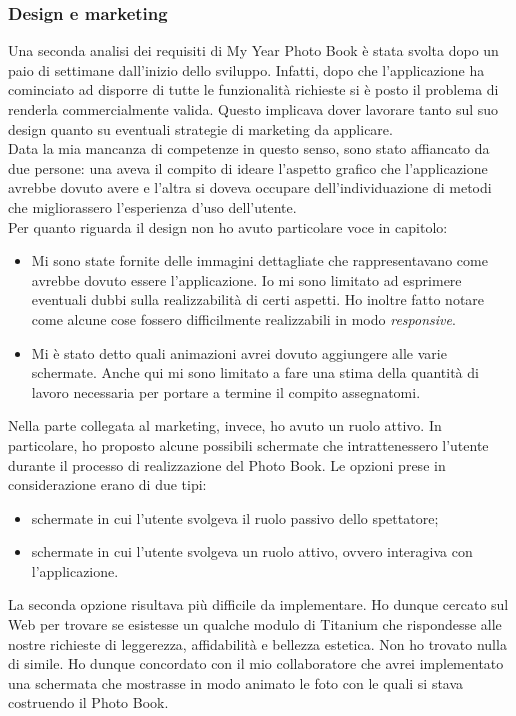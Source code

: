 			\subsubsection{Design e marketing}
				Una seconda analisi dei requisiti di My Year Photo Book è stata svolta dopo un paio di settimane dall'inizio dello
				sviluppo. Infatti, dopo che l'applicazione ha cominciato ad disporre di tutte le funzionalità richieste si è posto il
				problema di renderla commercialmente valida. Questo implicava dover lavorare tanto sul suo design quanto su eventuali
				strategie di marketing da applicare.\\
				Data la mia mancanza di competenze in questo senso, sono stato affiancato da due persone: una aveva il compito di
				ideare l'aspetto grafico che l'applicazione avrebbe dovuto avere e l'altra si doveva occupare dell'individuazione di
				metodi che migliorassero l'esperienza d'uso dell'utente.\\
				Per quanto riguarda il design non ho avuto particolare voce in capitolo:
				\begin{itemize}
					\item Mi sono state fornite delle immagini dettagliate che rappresentavano come avrebbe dovuto essere
					l'applicazione. Io mi sono limitato ad esprimere eventuali dubbi sulla realizzabilità di certi aspetti. Ho
					inoltre fatto notare come alcune cose fossero difficilmente realizzabili in modo \emph{responsive}.
					\item Mi è stato detto quali animazioni avrei dovuto aggiungere alle varie schermate. Anche qui mi sono
					limitato a fare una stima della quantità di lavoro necessaria per portare a termine il compito assegnatomi.
				\end{itemize}
				Nella parte collegata al marketing, invece, ho avuto un ruolo attivo. In particolare, ho proposto alcune possibili
				schermate che intrattenessero l'utente durante il processo di realizzazione del Photo Book. Le opzioni prese in
				considerazione erano di due tipi:
				\begin{itemize}
					\item schermate in cui l'utente svolgeva il ruolo passivo dello spettatore;
					\item schermate in cui l'utente svolgeva un ruolo attivo, ovvero interagiva con l'applicazione.
				\end{itemize}
				La seconda opzione risultava più difficile da implementare. Ho dunque cercato sul Web per trovare se esistesse un
				qualche modulo di Titanium che rispondesse alle nostre richieste di leggerezza, affidabilità e bellezza estetica. Non
				ho trovato nulla di simile. Ho dunque concordato con il mio collaboratore che avrei implementato una schermata
				che mostrasse in modo animato le foto con le quali si stava costruendo il Photo Book.

